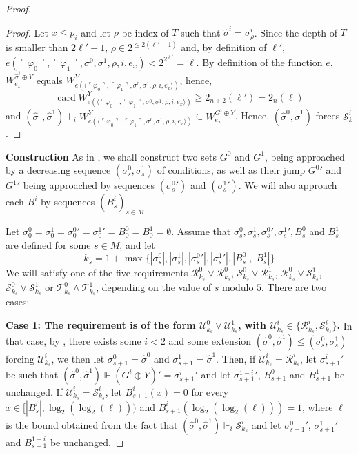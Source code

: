 \documentclass{article}
\def\R{\mathcal{R}}
\def\S{\mathcal{S}}
\newcommand{\card}{\operatorname{card}}
\numberwithin{theorem}{section}
\begin{document}
\begin{proof}
\begin{proof}
Let $x \leq p_i$ and let $\rho$ be index of $T$ such that $\hat \sigma^i = \sigma_{\rho}^i$. Since the depth of $T$ is smaller than $2\ell'-1$, $\rho \in 2^{\leq2(\ell' - 1)}$ and, by definition of $\ell'$, $e(\ulcorner\varphi_0 \urcorner, \ulcorner \varphi_1 \urcorner, \sigma^0, \sigma^1, \rho, i, e_x) < 2^{2^{\ell'}} = \ell$.
By definition of the function $e$, $W_{e_x}^{\hat{\sigma}^i \oplus Y}$ equals $W^Y_{e(\langle \ulcorner\varphi_0\urcorner, \ulcorner\varphi_1\urcorner, \sigma^0, \sigma^1, \rho, i, e_x\rangle)}$, hence, 
$$\card W^Y_{e(\langle \ulcorner\varphi_0\urcorner, \ulcorner\varphi_1\urcorner, \sigma^0, \sigma^1, \rho ,i,e_x\rangle)} \geq 2_{n+2}(\ell') = 2_n(\ell)$$ 
and $(\hat \sigma^0, \hat \sigma^1) \Vdash_i W^Y_{e(\langle \ulcorner\varphi_0\urcorner, \ulcorner\varphi_1\urcorner, \sigma^0, \sigma^1, \rho, i, e_x\rangle)} \subseteq W_{e_x}^{G^i \oplus Y}$. Hence, $(\hat \sigma^0, \hat \sigma^1)$ forces $\mathcal{S}_k^i$. 
\end{proof}


\textbf{Construction} 
As in \cite[Proposition 3.17]{houerou2025conservation}, we shall construct two sets
$G^0$ and $G^1$, being approached by a decreasing sequence $(\sigma^0_s,\sigma^1_s)$ of conditions, as well as their jump ${G^0}'$ and ${G^1}'$ being approached by sequences $({\sigma^0_s}')$ and $({\sigma^1_s}')$. We will also approach each $B^i$ by sequences $(B^i_s)_{s \in M}$.

Let $\sigma_0^0 = \sigma_0^1 = {\sigma^0_0}' = {\sigma^1_0}' = B^0_0 = B^1_0 = \emptyset$. Assume that $\sigma_s^0, \sigma_s^1, {\sigma^0_s}', {\sigma^1_s}', B^0_s$ and $B^1_s$ are defined for some $s \in M$, and let 
$$
k_s  = 1+\max \{|\sigma_s^0|, |\sigma_s^1|, |{\sigma^0_s}'|, |{\sigma^1_s}'|, |B^0_s|, |B^1_s|\}
$$
We will satisfy one of the five requirements $\R_{k_s}^0 \vee \R_{k_s}^0$, $\S_{k_s}^0 \vee \R_{k_s}^1$, $\R_{k_s}^0 \vee \S_{k_s}^1$, $\S_{k_s}^0 \vee \S_{k_s}^1$ or $\mathcal{T}^0_{k_s} \wedge \mathcal{T}^1_{k_s}$, depending on the value of $s$ modulo $5$.   
There are two cases:
\smallskip

\textbf{Case 1: The requirement is of the form $\mathcal{U}^0_{k_s} \vee \mathcal{U}^1_{k_s}$, with $\mathcal{U}^i_{k_s} \in \{\R^i_{k_s}, \S^i_{k_s}\}$.} In that case, by , there exists some $i < 2$ and some extension $(\hat \sigma^0, \hat \sigma^1) \leq (\sigma^0_s, \sigma^1_s)$ forcing $\mathcal{U}^i_{k_s}$, we then let $\sigma^0_{s+1} = \hat \sigma^0$ and $\sigma^1_{s+1} = \hat \sigma^1$. Then, if $\mathcal{U}^i_{k_s} = \R^i_{k_s}$, let ${\sigma^i_{s+1}}'$ be such that $(\hat \sigma^0, \hat \sigma^1) \Vdash (G^i \oplus Y)' = {\sigma^i_{s+1}}'$ and let ${\sigma^{1-i}_{s+1}}'$, $B^0_{s+1}$ and $B^1_{s+1}$ be unchanged. If $\mathcal{U}^i_{k_s} = \S^i_{k_s}$, let $B^i_{s+1}(x) = 0$ for every $x \in [|B^i_s|, \log_2(\log_2(\ell)))$ and $B^i_{s+1}(\log_2(\log_2(\ell))) = 1$, where $\ell$ is the bound obtained from the fact that $(\hat \sigma^0, \hat \sigma^1) \Vdash_i \S^i_{k_s}$ and let ${\sigma^{0}_{s+1}}'$, ${\sigma^{1}_{s+1}}'$ and $B^{1-i}_{s+1}$ be unchanged.
\smallskip


\end{proof}
\end{document}
